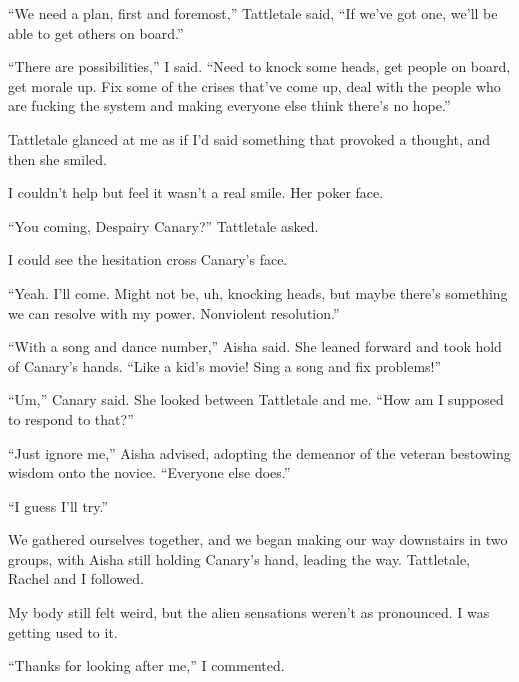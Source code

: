``We need a plan, first and foremost,'' Tattletale said, ``If we've got one, we'll be able to get others on board.''



``There are possibilities,'' I said.  ``Need to knock some heads, get people on board, get morale up.  Fix some of the crises that've come up, deal with the people who are fucking the system and making everyone else think there's no hope.''



Tattletale glanced at me as if I'd said something that provoked a thought, and then she smiled.



I couldn't help but feel it wasn't a real smile.  Her poker face.



``You coming, Despairy Canary?''  Tattletale asked.



I could see the hesitation cross Canary's face.



``Yeah.  I'll come.  Might not be, uh, knocking heads, but maybe there's something we can resolve with my power.  Nonviolent resolution.''



``With a song and dance number,'' Aisha said.  She leaned forward and took hold of Canary's hands.  ``Like a kid's movie!  Sing a song and fix problems!''



``Um,'' Canary said.  She looked between Tattletale and me.  ``How am I supposed to respond to that?''



``Just ignore me,'' Aisha advised, adopting the demeanor of the veteran bestowing wisdom onto the novice.  ``Everyone else does.''



``I guess I'll try.''



We gathered ourselves together, and we began making our way downstairs in two groups, with Aisha still holding Canary's hand, leading the way.  Tattletale, Rachel and I followed.



My body still felt weird, but the alien sensations weren't as pronounced.  I was getting used to it.



``Thanks for looking after me,'' I commented.



